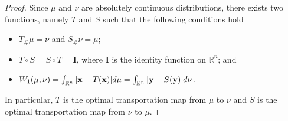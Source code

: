 \documentclass{article}
\def \Id{\mathbf{I}}
\def\bx{{\bf x}}
\def\by{{\bf y}}
\def \erre{\mathbb{R}}
\newtheorem{proof}{Proof}
\begin{document}
\begin{proof}
    Since $\mu$ and $\nu$ are absolutely continuous distributions, there exists two functions, namely $T$ and $S$ such that the following conditions hold
    \begin{itemize}
        \item $T_\#\mu=\nu$ and $S_\#\nu=\mu$;
        \item $T\circ S= S \circ T= \Id$, where $\Id$ is the identity function on $\erre^n$; and
        \item $W_1(\mu,\nu)=\int_{\erre^{n}}|\bx-T(\bx)|d\mu=\int_{\erre^{n}}|\by-S(\by)|d\nu$.
    \end{itemize}
    In particular, $T$ is the optimal transportation map from $\mu$ to $\nu$ and $S$ is the optimal transportation map from $\nu$ to $\mu$.


\end{proof}
\end{document}
